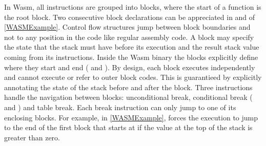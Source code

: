 In Wasm, all instructions are grouped into blocks, where the start of a function is the root block. Two consecutive block declarations can be appreciated in  and  of \autoref{WASMExample}. Control flow structures jump between block boundaries and not to any position in the code like regular assembly code. A block may specify the state that the stack must have before its execution and the result stack value coming from its instructions. Inside the Wasm  binary the blocks explicitly define where they start and end ( and ). By design, each block executes independently and cannot execute or refer to outer block codes. This is guarantieed by explicitly annotating the state of the stack before and after the block. Three instructions handle the navigation between blocks: unconditional break, conditional break ( and ) and table break. Each break instruction can only jump to one of its enclosing blocks. For example, in \autoref{WASMExample},  forces the execution to jump to the end of the first block that starts at  if the value at the top of the stack is greater than zero.










